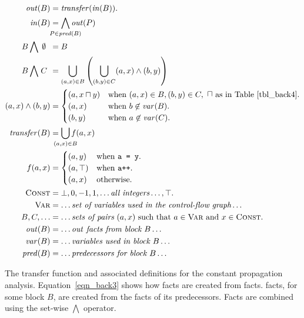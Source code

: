 \begin{myfig}
\begin{align}
  \outBa &= \mathit{transfer}(\inBa). \label{eqn_back3} \\
  \inBa &= \bigwedge\limits_{\mathclap{P \in \mathit{pred}(B)}} \outXa{P} \\ 
  B \bigwedge\ \,\mathclap{\emptyset}\phantom{C} &= B \notag\\
  B \bigwedge\ \,\mathclap{C}\phantom{C} &= \bigcup\limits_{(a,x) \in B}
                    \left(\bigcup\limits_{(b,y) \in C} (a,x) \wedge (b,y)\right) \\ 
  (a,x) \wedge (b,y) &= 
  \begin{cases}
    (a,x \lub y) & \text{when}\ (a,x) \in B, (b,y) \in C,\ \text{\lub as in Table~\ref{tbl_back4}.}\\
    (a,x) & \text{when}\ b \not\in \mathit{var}(B). \\
    (b,y) & \text{when}\ a \not\in \mathit{var}(C). \\
  \end{cases} \\ 
  \mathit{transfer}(B) &= \bigcup\limits_{\mathclap{(a,x) \in B}} f(a,x) \\
  f (a,x) &= 
  \begin{cases}
    (a,y) & \text{when \texttt{a = y}}. \\
    (a,\top) & \text{when \texttt{a++}}. \\
    (a,x) & \text{otherwise}. \\
  \end{cases} \\
  \setLC &= \bot, 0, -1, 1, \dots \text{\it all integers} \dots, \top. \notag\\
  \setL{Var} &= \dots \text{\it set of variables used in the control-flow graph} \dots \notag\\
  B, C, \dots &= \dots \text{\it sets of pairs}\ (a, x)\ \text{such that}\ a \in 
    \setL{Var}\ \text{and}\ x \in \setLC. \notag\\
  \mathit{out}(B) &= \dots \text{\it \out facts from block $B$}\dots \notag\\
  \mathit{var}(B) &= \dots \text{\it variables used in block $B$}\dots \notag\\
  \mathit{pred}(B) &= \dots \text{\it predecessors for block $B$}\dots \notag
\end{align}
\caption{The transfer function and associated definitions for the constant
  propagation analysis. Equation~\eqref{eqn_back3} shows how \out facts are
  created from \inE facts. \InBa facts, for some block $B$, are created from
  the \outBa facts of its predecessors. Facts are combined using the set-wise
  $\bigwedge$ operator.}
\label{fig_back10}
\end{myfig}
